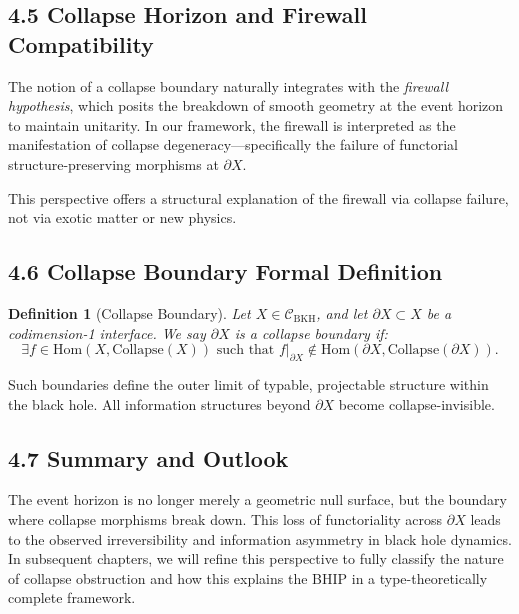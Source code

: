 \documentclass[11pt]{article}
\newtheorem{definition}[theorem]{Definition}
\begin{document}
\subsection*{4.5 Collapse Horizon and Firewall Compatibility}

The notion of a collapse boundary naturally integrates with the \textit{firewall hypothesis}, which posits the breakdown of smooth geometry at the event horizon to maintain unitarity. In our framework, the firewall is interpreted as the manifestation of collapse degeneracy—specifically the failure of functorial structure-preserving morphisms at \( \partial X \).

This perspective offers a structural explanation of the firewall via collapse failure, not via exotic matter or new physics.

\subsection*{4.6 Collapse Boundary Formal Definition}

\begin{definition}[Collapse Boundary]
Let \( X \in \mathcal{C}_{\mathrm{BKH}} \), and let \( \partial X \subset X \) be a codimension-1 interface. We say \( \partial X \) is a \emph{collapse boundary} if:
\[
\exists f \in \mathrm{Hom}(X, \mathrm{Collapse}(X)) \text{ such that } f|_{\partial X} \notin \mathrm{Hom}(\partial X, \mathrm{Collapse}(\partial X)).
\]
\end{definition}

Such boundaries define the outer limit of typable, projectable structure within the black hole. All information structures beyond \( \partial X \) become collapse-invisible.

\subsection*{4.7 Summary and Outlook}

The event horizon is no longer merely a geometric null surface, but the boundary where collapse morphisms break down. This loss of functoriality across \( \partial X \) leads to the observed irreversibility and information asymmetry in black hole dynamics. In subsequent chapters, we will refine this perspective to fully classify the nature of collapse obstruction and how this explains the BHIP in a type-theoretically complete framework.



\end{document}
